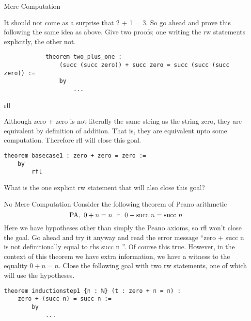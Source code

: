 \documentclass{book}
\begin{document}
\begin{eg}{Mere Computation}

    It should not come as a surprise that 2 + 1 = 3. So go ahead and prove this following the same idea as above. Give two proofs; one writing the rw statements explicitly, the other not. 

    \begin{center}
        \begin{lstlisting}
            theorem two_plus_one : 
                (succ (succ zero)) + succ zero = succ (succ (succ zero)) :=
                by
                    ...
        \end{lstlisting}
    \end{center}
\end{eg}

\begin{eg}{rfl}

    Although zero + zero is not literally the same string as the string zero, they are equivalent by definition of addition. That is, they are equivalent upto some computation. Therefore rfl will close this goal.

    \begin{center}
        \begin{lstlisting}
theorem basecase1 : zero + zero = zero :=
    by
        rfl
        \end{lstlisting}
    \end{center}

    What is the one explicit rw statement that will also close this goal? 
\end{eg}

\newpage
\begin{eg}{No Mere Computation}
    Consider the following theorem of Peano arithmetic $$\text{PA}, \ 0 + n = n \ \vdash \ 0 + \text{succ} \ n = \text{succ} \ n$$Here we have hypotheses other than simply the Peano axioms, so rfl won't close the goal. Go ahead and try it anyway and read the error message ``zero + succ n is not definitionally equal to rhs succ n
    ''. Of course this true. However, in the context of this theorem we have extra information, we have a witness to the equality $0 + n = n$. Close the following goal with two rw statements, one of which will use the hypotheses. 

    \begin{center}
        \begin{lstlisting}
theorem inductionstep1 {n : ℕ} (t : zero + n = n) : 
    zero + (succ n) = succ n :=
        by
            ...
        \end{lstlisting}
    \end{center}
\end{eg}
\end{document}
